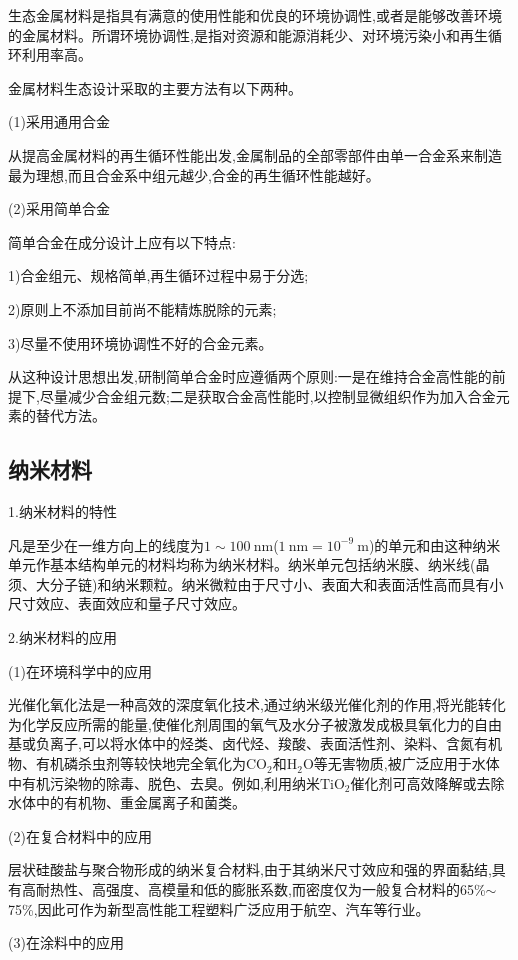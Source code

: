 \documentclass[UTF8]{ctexbook}
\newcommand{\◎}{\ensuremath{\bigcirc}}
\begin{document}
生态金属材料是指具有满意的使用性能和优良的环境协调性,或者是能够改善环境的金属材料。所谓环境协调性,是指对资源和能源消耗少、对环境污染小和再生循环利用率高。

金属材料生态设计采取的主要方法有以下两种。

(1)采用通用合金

从提高金属材料的再生循环性能出发,金属制品的全部零部件由单一合金系来制造最为理想,而且合金系中组元越少,合金的再生循环性能越好。

(2)采用简单合金

简单合金在成分设计上应有以下特点:

1)合金组元、规格简单,再生循环过程中易于分选;

2)原则上不添加目前尚不能精炼脱除的元素;

3)尽量不使用环境协调性不好的合金元素。

从这种设计思想出发,研制简单合金时应遵循两个原则:一是在维持合金高性能的前提下,尽量减少合金组元数;二是获取合金高性能时,以控制显微组织作为加入合金元素的替代方法。

\subsection{纳米材料}

1.纳米材料的特性

凡是至少在一维方向上的线度为$1\sim100~\mathrm{nm}$($1~\mathrm{nm}=10^{-9}~\mathrm{m}$)的单元和由这种纳米单元作基本结构单元的材料均称为纳米材料。纳米单元包括纳米膜、纳米线(晶须、大分子链)和纳米颗粒。纳米微粒由于尺寸小、表面大和表面活性高而具有小尺寸效应、表面效应和量子尺寸效应。

2.纳米材料的应用

(1)在环境科学中的应用

光催化氧化法是一种高效的深度氧化技术,通过纳米级光催化剂的作用,将光能转化为化学反应所需的能量,使催化剂周围的氧气及水分子被激发成极具氧化力的自由基或负离子,可以将水体中的烃类、卤代烃、羧酸、表面活性剂、染料、含氮有机物、有机磷杀虫剂等较快地完全氧化为$\mathrm{CO_2}$和$\mathrm{H_2O}$等无害物质,被广泛应用于水体中有机污染物的除毒、脱色、去臭。例如,利用纳米$\mathrm{TiO_2}$催化剂可高效降解或去除水体中的有机物、重金属离子和菌类。

(2)在复合材料中的应用

层状硅酸盐与聚合物形成的纳米复合材料,由于其纳米尺寸效应和强的界面黏结,具有高耐热性、高强度、高模量和低的膨胀系数,而密度仅为一般复合材料的65\%$\sim$75\%,因此可作为新型高性能工程塑料广泛应用于航空、汽车等行业。

(3)在涂料中的应用
\end{document}
